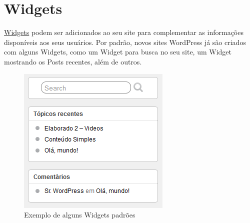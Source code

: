 \documentclass[12pt,onecolumn]{article}
\begin{document}
\section{Widgets}
	\href{http://pt.wikipedia.org/wiki/Widget}{Widgets} podem ser adicionados ao seu site para 
	complementar as informações disponíveis aos seus usuários. Por padrão, novos sites WordPress
	já são criados com alguns Widgets, como um Widget para busca no seu site, um Widget mostrando 
	os Posts recentes, além de outros.
	\begin{figure}[H]
		\centering
		\includegraphics{widgets1.png}
		\caption{Exemplo de alguns Widgets padrões}
	\end{figure}
\end{document}
